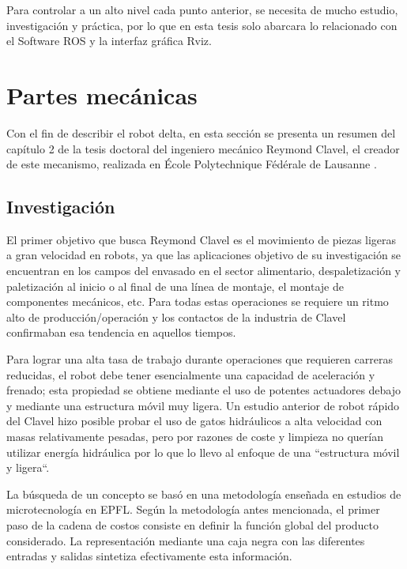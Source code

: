     Para controlar a un alto nivel cada punto anterior, se necesita de mucho estudio, investigación y práctica, por lo que en esta tesis solo abarcara lo relacionado con el Software ROS y la interfaz gráfica Rviz.  
    
    \newpage

    
\section{Partes mecánicas}
    Con el fin de describir el robot delta, en esta sección se presenta un resumen del capítulo 2 de la tesis doctoral del ingeniero mecánico Reymond Clavel, el creador de este mecanismo, realizada en École Polytechnique Fédérale de Lausanne \cite{Clavel:31403}. 

    
    \subsection{Investigación}
    El primer objetivo que busca Reymond Clavel es el movimiento de piezas ligeras a gran velocidad en robots, ya que las aplicaciones objetivo de su investigación se encuentran en los campos del envasado en el sector alimentario, despaletización y paletización al inicio o al final de una línea de montaje, el montaje de componentes mecánicos, etc. Para todas estas operaciones se requiere un ritmo alto de producción/operación y los contactos de la industria de Clavel confirmaban esa tendencia en aquellos tiempos.
    
    Para lograr una alta tasa de trabajo durante operaciones que requieren carreras reducidas, el robot debe tener esencialmente una capacidad de aceleración y frenado; esta propiedad se obtiene mediante el uso de potentes actuadores debajo y mediante una estructura móvil muy ligera. Un estudio anterior de robot rápido del Clavel hizo posible probar el uso de gatos hidráulicos a alta velocidad con masas relativamente pesadas, pero por razones de coste y limpieza no querían utilizar energía hidráulica por lo que lo llevo al enfoque de una ``estructura móvil y ligera``.
    
    La búsqueda de un concepto se basó en una metodología enseñada en estudios de microtecnología en EPFL. Según la metodología antes mencionada, el primer paso de la cadena de costos consiste en definir la función global del producto considerado. La representación mediante una caja negra con las diferentes entradas y salidas sintetiza efectivamente esta información.
    
